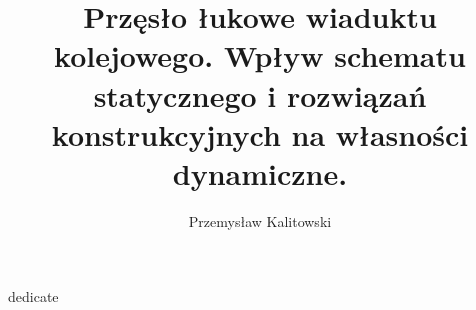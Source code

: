 
\title{Przęsło łukowe wiaduktu kolejowego. Wpływ schematu statycznego i rozwiązań konstrukcyjnych na własności dynamiczne.}
\author{Przemysław Kalitowski}




\frontmatter

\myemptypage



\myemptypage





\thispagestyle{empty}
\vspace*{20cm}
\hfill dedicate
\vfill
\pagebreak[4]


\myemptypage


\tableofcontents
\newpage






\mainmatter




	





	





\printbibliography[heading=bibintoc]


